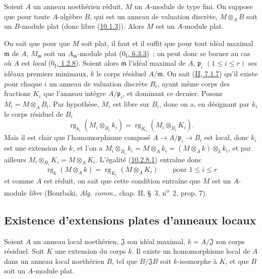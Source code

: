 \begin{proposition}[10.2.8]
\label{0.10.2.8-fr}
Soient $A$ un anneau noethérien réduit, $M$ un $A$-module de type fini. On
suppose que pour toute $A$-algèbre $B$, qui est un anneau de valuation
discrète, $M\otimes_A B$ soit un $B$-module plat (donc libre
(\hyperref[0.10.1.3-fr]{10.1.3})). Alors $M$ est un $A$-module plat.
\end{proposition}

On sait que pour que $M$ soit plat, il faut et il suffit que pour tout idéal
maximal $\mathfrak m$ de $A$, $M_{\mathfrak m}$ soit un
$A_{\mathfrak m}$-module plat
(\hyperref[0.6.3.3-fr]{$0_{\mathrm I}$, 6.3.3})~; on peut donc se borner au cas
où $A$ est \emph{local} (\hyperref[0.1.2.8-fr]{$0_{\mathrm I}$, 1.2.8}).
Soient alors $\mathfrak m$ l'idéal maximal de $A$, $\mathfrak p_i$
$(1\leq i\leq r)$ ses idéaux premiers minimaux, $k$ le corps résiduel
$A/\mathfrak m$. On sait (\hyperref[II.7.1.7-fr]{II, 7.1.7}) qu'il existe
pour chaque $i$ un anneau de valuation discrète $B_i$, ayant même corps des
fractions $K_i$ que l'anneau intègre $A/\mathfrak p_i$, et dominant ce
dernier. Posons $M_i=M\otimes_A B_i$. Par hypothèse, $M_i$ est libre sur
$B_i$, donc on a, en désignant par $k_i$ le corps résiduel de $B_i$
\[
\label{0.10.2.8.1-fr}
  \operatorname{rg}_{k_i}(M_i\otimes_{B_i}k_i)
  =\operatorname{rg}_{K_i}(M_i\otimes_{B_i}K_i).
  \tag{10.2.8.1}
\]
Mais il est clair que l'homomorphisme composé
$A\to A/\mathfrak p_i\to B_i$ est local, donc $k_i$ est une extension de $k$,
et l'on a
$M_i\otimes_{B_i}k_i=M\otimes_A k_i=(M\otimes_A k)\otimes_k k_i$, et par
ailleurs $M_i\otimes_{B_i}K_i=M\otimes_A K_i$. L'égalité
(\hyperref[0.10.2.8.1-fr]{10.2.8.1}) entraîne donc
\[
  \operatorname{rg}_k(M\otimes_A k)=\operatorname{rg}_{K_i}(M\otimes_A K_i)
  \qquad\text{pour }1\leq i\leq r
\]
et comme $A$ est réduit, on sait que cette condition entraîne que $M$ est un
$A$-module \emph{libre} (Bourbaki, \emph{Alg. comm.}, chap. II, \S~3,
n\textsuperscript{o}~2, prop. 7).

\subsection{Existence d'extensions plates d'anneaux locaux}
\label{subsection:0.10.3-fr}

\begin{proposition}[10.3.1]
\label{0.10.3.1-fr}
Soient $A$ un anneau local noethérien, $\mathfrak J$ son idéal maximal,
$k=A/\mathfrak J$ son corps résiduel. Soit $K$ une extension du corps $k$. Il
existe un homomorphisme local de $A$ dans un anneau local noethérien $B$, tel
que $B/\mathfrak J B$ soit $k$-isomorphe à $K$, et que $B$ soit un
$A$-module plat.
\end{proposition}

